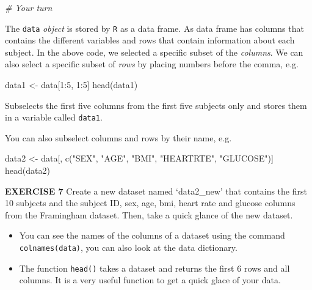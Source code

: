 \documentclass[
]{article}
\newenvironment{Shaded}{\begin{snugshade}}{\end{snugshade}}
\newcommand{\CommentTok}[1]{\textcolor[rgb]{0.56,0.35,0.01}{\textit{#1}}}
\newcommand{\DecValTok}[1]{\textcolor[rgb]{0.00,0.00,0.81}{#1}}
\newcommand{\FunctionTok}[1]{\textcolor[rgb]{0.00,0.00,0.00}{#1}}
\newcommand{\NormalTok}[1]{#1}
\newcommand{\OtherTok}[1]{\textcolor[rgb]{0.56,0.35,0.01}{#1}}
\newcommand{\SpecialCharTok}[1]{\textcolor[rgb]{0.00,0.00,0.00}{#1}}
\newcommand{\StringTok}[1]{\textcolor[rgb]{0.31,0.60,0.02}{#1}}
\begin{document}
\begin{Shaded}
\begin{Highlighting}[]
\CommentTok{\# Your turn}
\end{Highlighting}
\end{Shaded}

The \texttt{data} \emph{object} is stored by \texttt{R} as a data frame.
As data frame has columns that contains the different variables and rows
that contain information about each subject. In the above code, we
selected a specific subset of the \emph{columns}. We can also select a
specific subset of \emph{rows} by placing numbers before the comma,
e.g.~

\begin{Shaded}
\begin{Highlighting}[]
\NormalTok{data1 }\OtherTok{\textless{}{-}}\NormalTok{ data[}\DecValTok{1}\SpecialCharTok{:}\DecValTok{5}\NormalTok{, }\DecValTok{1}\SpecialCharTok{:}\DecValTok{5}\NormalTok{]}
\FunctionTok{head}\NormalTok{(data1)}
\end{Highlighting}
\end{Shaded}

Subselects the first five columns from the first five subjects only and
stores them in a variable called \texttt{data1}.

You can also subselect columns and rows by their name, e.g.

\begin{Shaded}
\begin{Highlighting}[]
\NormalTok{data2 }\OtherTok{\textless{}{-}}\NormalTok{ data[, }\FunctionTok{c}\NormalTok{(}\StringTok{"SEX"}\NormalTok{, }\StringTok{"AGE"}\NormalTok{, }\StringTok{"BMI"}\NormalTok{, }\StringTok{"HEARTRTE"}\NormalTok{, }\StringTok{"GLUCOSE"}\NormalTok{)]}
\FunctionTok{head}\NormalTok{(data2)}
\end{Highlighting}
\end{Shaded}

\textbf{EXERCISE 7} Create a new dataset named `data2\_new' that
contains the first 10 subjects and the subject ID, sex, age, bmi, heart
rate and glucose columns from the Framingham dataset. Then, take a quick
glance of the new dataset.

\begin{itemize}
\item
  You can see the names of the columns of a dataset using the command
  \texttt{colnames(data)}, you can also look at the data dictionary.
\item
  The function \texttt{head()} takes a dataset and returns the first 6
  rows and all columns. It is a very useful function to get a quick
  glace of your data.
\end{itemize}
\end{document}
